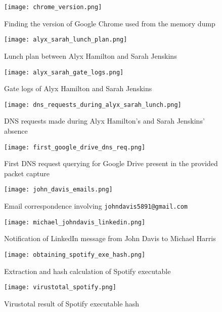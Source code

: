 \begin{figure}[H]
    \centering
    \texttt{[image: chrome\_version.png]}
    \caption{Finding the version of Google Chrome used from the memory dump}
    \label{chrome_version}
\end{figure}

\begin{figure}[H]
    \centering
    \texttt{[image: alyx\_sarah\_lunch\_plan.png]}
    \caption{Lunch plan between Alyx Hamilton and Sarah Jenskins}
    \label{alyx_sarah_lunch_plan}
\end{figure}
\begin{figure}[H]
    \centering
    \texttt{[image: alyx\_sarah\_gate\_logs.png]}
    \caption{Gate logs of Alyx Hamilton and Sarah Jenskins}
    \label{hamilton_gate_logs}
\end{figure}
\begin{figure}[H]
    \centering
    \texttt{[image: dns\_requests\_during\_alyx\_sarah\_lunch.png]}
    \caption{DNS requests made during Alyx Hamilton's and Sarah Jenskins' absence}
    \label{dns_requests_during_alyx_sarah_lunch}
\end{figure}
\begin{figure}[H]
    \centering
    \texttt{[image: first\_google\_drive\_dns\_req.png]}
    \caption{First DNS request querying for Google Drive present in the provided packet capture}
    \label{first_google_drive_dns_req}
\end{figure}
\begin{figure}[H]
    \centering
    \texttt{[image: john\_davis\_emails.png]}
    \caption{Email correspondence involving \texttt{johndavis5891@gmail.com}}
    \label{john_davis_emails}
\end{figure}
\begin{figure}[H]
    \centering
    \texttt{[image: michael\_johndavis\_linkedin.png]}
    \caption{Notification of LinkedIn message from John Davis to Michael Harris}
    \label{michael_johndavis_linkedin}
\end{figure}
\begin{figure}[H]
    \centering
    \texttt{[image: obtaining\_spotify\_exe\_hash.png]}
    \caption{Extraction and hash calculation of Spotify executable}
    \label{obtaining_spotify_exe_hash}
\end{figure}

\begin{figure}[H]
    \centering
    \texttt{[image: virustotal\_spotify.png]}
    \caption{Virustotal result of Spotify executable hash}
    \label{virustotal_spotify}
\end{figure}


